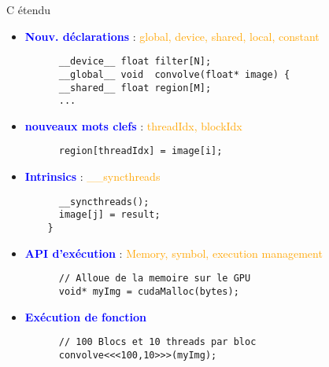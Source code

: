 \documentclass{beamer}
\begin{document}
\begin{frame}[containsverbatim]{C étendu}

  \begin{itemize}
  \item \textbf{\textcolor{blue}{Nouv. déclarations}} : \textcolor{orange}{\small global, device, shared, local, constant}
    \begin{lstlisting}
      __device__ float filter[N];
      __global__ void  convolve(float* image) {
      __shared__ float region[M];
      ...
    \end{lstlisting}
  \item \textbf{\textcolor{blue}{nouveaux mots clefs}} : 
    \textcolor{orange}{\small threadIdx, blockIdx}
    \begin{lstlisting}
      region[threadIdx] = image[i];
    \end{lstlisting}
  \item \textbf{\textcolor{blue}{Intrinsics}} : 
    \textcolor{orange}{\small \_\_syncthreads}
    \begin{lstlisting}
      __syncthreads();
      image[j] = result;
    }
  \end{lstlisting}
  \item \textbf{\textcolor{blue}{API d'exécution}} :
    \textcolor{orange}{\small Memory, symbol, execution management}
    \begin{lstlisting}
      // Alloue de la memoire sur le GPU
      void* myImg = cudaMalloc(bytes);
    \end{lstlisting}
  \item \textcolor{blue}{\bf Exécution de fonction}
    \begin{lstlisting}
      // 100 Blocs et 10 threads par bloc
      convolve<<<100,10>>>(myImg);
    \end{lstlisting}
  \end{itemize}
\end{frame}
\end{document}
